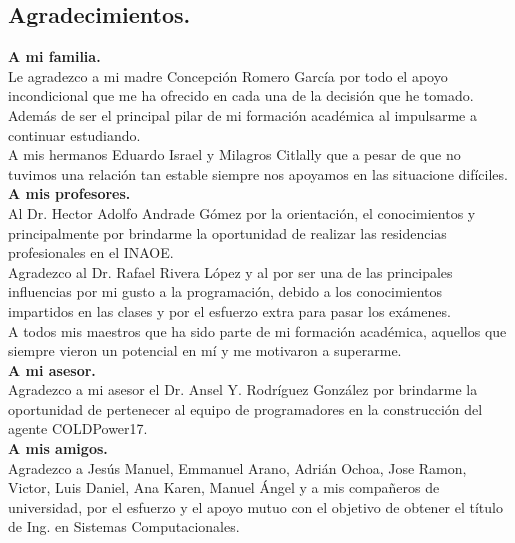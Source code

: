 \begin{center}
	\section*{Agradecimientos.}   
\end{center}
\setcounter{page}{1}

\textbf{A mi familia.}
\\

Le agradezco a mi madre Concepción Romero García por todo el apoyo incondicional que me ha ofrecido en cada una de la decisión que he tomado. Además de ser el principal pilar de mi formación académica al impulsarme a continuar estudiando.
\\

A mis hermanos Eduardo Israel y Milagros Citlally que a pesar de que no tuvimos una relación tan estable siempre nos apoyamos en las situacione difíciles.
\\

\textbf{A mis profesores.}
\\

Al Dr. Hector Adolfo Andrade Gómez por la orientación, el conocimientos  y principalmente por brindarme la oportunidad de realizar las residencias profesionales en el INAOE.
\\

Agradezco al Dr. Rafael Rivera López y al por ser una de las principales influencias por mi gusto a la programación, debido a los conocimientos impartidos en las clases y por el esfuerzo extra para pasar los exámenes.
\\

A todos mis maestros que ha sido parte de mi formación académica, aquellos que siempre vieron un potencial en mí y me motivaron a superarme.
\\

\textbf{A mi asesor.}
\\

Agradezco a mi asesor el Dr. Ansel Y. Rodríguez González por brindarme la oportunidad de pertenecer al equipo de programadores en la construcción del agente COLDPower17.
\\

\textbf{A mis amigos.}
\\

Agradezco a  Jesús Manuel, Emmanuel Arano, Adrián Ochoa, Jose Ramon, Victor, Luis Daniel, Ana Karen, Manuel Ángel y a mis compañeros de universidad, por el esfuerzo y el apoyo mutuo con el objetivo de obtener el título de Ing. en Sistemas Computacionales.
\\
